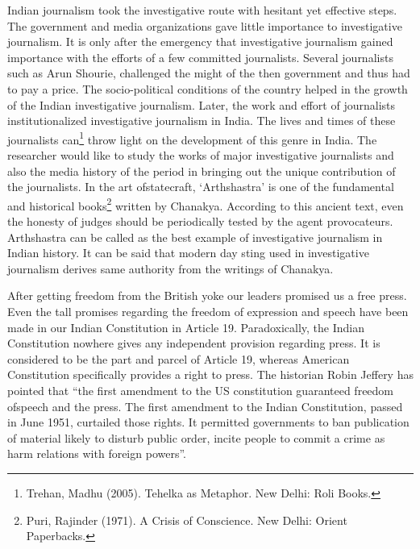 \setcounter{figure}{0}
\setcounter{table}{0}
\setcounter{footnote}{0}

\label{2017-art6}

\begin{multicols}{2}


\noi
Indian journalism took the investigative route with hesitant yet effective steps. The government
and media organizations gave little importance to investigative journalism. It is only after the
emergency that investigative journalism gained importance with the efforts of a few committed
journalists. Several journalists such as Arun Shourie, challenged the might of the then
government and thus had to pay a price. The socio-political conditions of the country helped in
the growth of the Indian investigative journalism. Later, the work and effort of journalists
institutionalized investigative journalism in India. The lives and times of these journalists can\footnote{Trehan, Madhu (2005). Tehelka as Metaphor. New Delhi: Roli Books.}
throw light on the development of this genre in India. The researcher would like to study the
works of major investigative journalists and also the media history of the period in bringing
out the unique contribution of the journalists. In the art ofstatecraft, ‘Arthshastra’ is one of the
fundamental and historical books\footnote{Puri, Rajinder (1971). A Crisis of Conscience. New Delhi: Orient Paperbacks.} written by Chanakya. According to this ancient text, even
the honesty of judges should be periodically tested by the agent provocateurs. Arthshastra can
be called as the best example of investigative journalism in Indian history. It can be said that
modern day sting used in investigative journalism derives same authority from the writings of
Chanakya.


\noi
After getting freedom from the British yoke our leaders promised us a free press. Even the tall
promises regarding the freedom of expression and speech have been made in our Indian
Constitution in Article 19. Paradoxically, the Indian Constitution nowhere gives any independent
provision regarding press. It is considered to be the part and parcel of Article 19, whereas
American Constitution specifically provides a right to press. The historian Robin Jeffery has
pointed that “the first amendment to the US constitution guaranteed freedom ofspeech and the
press. The first amendment to the Indian Constitution, passed in June 1951, curtailed those
rights. It permitted governments to ban publication of material likely to disturb public order,
incite people to commit a crime as harm relations with foreign powers”.


\end{multicols}
